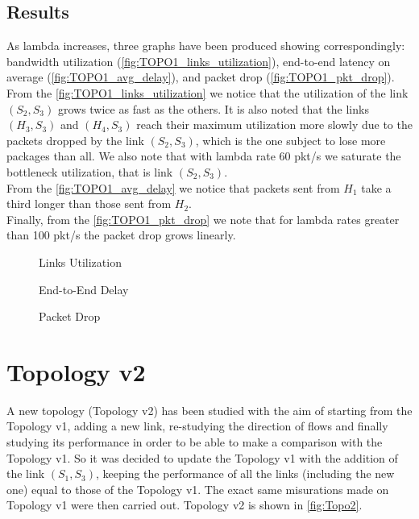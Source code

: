 \documentclass{article}
\begin{document}
\subsection{Results}
As lambda increases, three graphs have been produced showing correspondingly: bandwidth utilization (\autoref{fig:TOPO1_links_utilization}), end-to-end latency on average (\autoref{fig:TOPO1_avg_delay}), and packet drop (\autoref{fig:TOPO1_pkt_drop}).\\
From the \autoref{fig:TOPO1_links_utilization} we notice that the utilization of the link $(S_2, S_3)$ grows twice as fast as the others. It is also noted that the links $(H_3, S_3)$ and $(H_4, S_3)$ reach their maximum utilization more slowly due to the packets dropped by the link $(S_2, S_3)$, which is the one subject to lose more packages than all. We also note that with lambda rate 60 pkt/s we saturate the bottleneck utilization, that is link $(S_2, S_3)$.\\
From the \autoref{fig:TOPO1_avg_delay} we notice that packets sent from $H_1$ take a third longer than those sent from $H_2$.\\
Finally, from the \autoref{fig:TOPO1_pkt_drop} we note that for lambda rates greater than 100 pkt/s the packet drop grows linearly.
\begin{figure}[H]
    \centering
    
    \caption{Links Utilization}
    \label{fig:TOPO1_links_utilization}
\end{figure}
\begin{figure}[H]
    \centering
    
    \caption{End-to-End Delay}
    \label{fig:TOPO1_avg_delay}
\end{figure}
\begin{figure}[H]
    \centering
    
    \caption{Packet Drop}
    \label{fig:TOPO1_pkt_drop}
\end{figure}

\section{Topology v2}
A new topology (Topology v2) has been studied with the aim of starting from the Topology v1, adding a new link, re-studying the direction of flows and finally studying its performance in order to be able to make a comparison with the Topology v1. So it was decided to update the Topology v1 with the addition of the link $(S_1, S_3)$, keeping the performance of all the links (including the new one) equal to those of the Topology v1. The exact same misurations made on Topology v1 were then carried out. Topology v2 is shown in \autoref{fig:Topo2}.
\end{document}
